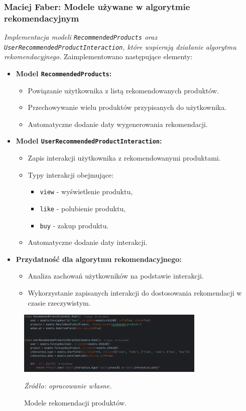 \documentclass[12pt,a4paper,oneside]{article}
\theoremstyle{definition}
\numberwithin{equation}{section}
\begin{document}
\subsubsection{Maciej Faber: Modele używane w algorytmie rekomendacyjnym}
\label{section:1.3.50}
\textit{
Implementacja modeli \texttt{RecommendedProducts} oraz \texttt{UserRecommendedProductInteraction}, które wspierają działanie algorytmu rekomendacyjnego.
}
Zaimplementowano następujące elementy:
\begin{itemize}
    \item \textbf{Model \texttt{RecommendedProducts}:}
    \begin{itemize}
        \item Powiązanie użytkownika z listą rekomendowanych produktów.
        \item Przechowywanie wielu produktów przypisanych do użytkownika.
        \item Automatyczne dodanie daty wygenerowania rekomendacji.
    \end{itemize}
    \item \textbf{Model \texttt{UserRecommendedProductInteraction}:}
    \begin{itemize}
        \item Zapis interakcji użytkownika z rekomendowanymi produktami.
        \item Typy interakcji obejmujące:
        \begin{itemize}
            \item \texttt{view} - wyświetlenie produktu,
            \item \texttt{like} - polubienie produktu,
            \item \texttt{buy} - zakup produktu.
        \end{itemize}
        \item Automatyczne dodanie daty interakcji.
    \end{itemize}
    \item \textbf{Przydatność dla algorytmu rekomendacyjnego:}
    \begin{itemize}
        \item Analiza zachowań użytkowników na podstawie interakcji.
        \item Wykorzystanie zapisanych interakcji do dostosowania rekomendacji w czasie rzeczywistym.
    \end{itemize}
\end{itemize}
\begin{figure}[H]
    \centering
    \includegraphics[width=0.8\textwidth]{images/krzysztofBImages/recomended_models.png}
    \caption{Modele rekomendacji produktów.}
    \emph{Źródło: opracowanie własne.}
    \label{fig:recommended_products}
\end{figure}
%
%
\end{document}
